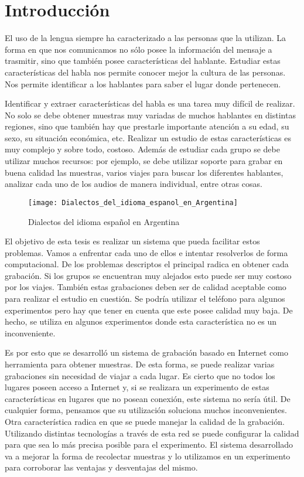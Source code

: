 
\chapter{Introducción}


El uso de la lengua siempre ha caracterizado a las personas que la utilizan. La forma en que nos comunicamos no sólo posee la información del mensaje a trasmitir, sino que también posee características del hablante. Estudiar estas características del habla nos permite conocer mejor la cultura de las personas. Nos permite identificar a los hablantes para saber el lugar donde pertenecen.

Identificar y extraer características del habla es una tarea muy difícil de realizar. No solo se debe obtener muestras muy variadas de muchos hablantes en distintas regiones, sino que también hay que prestarle importante atención a su edad, su sexo, su situación económica, etc. Realizar un estudio de estas características es muy complejo y sobre todo, costoso. Además de estudiar cada grupo se debe utilizar muchos recursos: por ejemplo, se debe utilizar soporte para grabar en buena calidad las muestras, varios viajes para buscar los diferentes hablantes, analizar cada uno de los audios de manera individual, entre otras cosas. 

\begin{figure}[h!]
	\centering
    \texttt{[image: Dialectos\_del\_idioma\_espanol\_en\_Argentina]} 
    \caption{Dialectos del idioma español en Argentina}
    \label{fig11}
\end{figure}

El objetivo de esta tesis es realizar un sistema que pueda facilitar estos problemas. Vamos a enfrentar cada uno de ellos e intentar resolverlos de forma computacional. De los problemas descriptos el principal radica en obtener cada grabación. Si los grupos se encuentran muy alejados esto puede ser muy costoso por los viajes. También estas grabaciones deben ser de calidad aceptable como para realizar el estudio en cuestión. Se podría utilizar el teléfono para algunos experimentos pero hay que tener en cuenta que este posee calidad muy baja. De hecho, se utiliza en algunos experimentos donde esta característica no es un inconveniente. 

Es por esto que se desarrolló un sistema de grabación basado en Internet como herramienta para obtener muestras. De esta forma, se puede realizar varias grabaciones sin necesidad de viajar a cada lugar. Es cierto que no todos los lugares poseen acceso a Internet y, si se realizara un experimento de estas características en lugares que no posean conexión, este sistema no sería útil. De cualquier forma, pensamos que su utilización soluciona muchos inconvenientes. Otra característica radica en que se puede manejar la calidad de la grabación. Utilizando distintas tecnologías a través de esta red se puede configurar la calidad para que sea lo más precisa posible para el experimento. El sistema desarrollado va a mejorar la forma de recolectar muestras y lo utilizamos en un experimento para corroborar las ventajas y desventajas del mismo.

